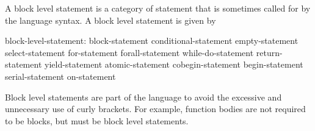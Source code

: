 A block level statement is a category of statement that is sometimes
called for by the language syntax. A block level statement is given by
\begin{syntax}
block-level-statement:
  block-statement
  conditional-statement
  empty-statement
  select-statement
  for-statement
  forall-statement
  while-do-statement
  return-statement
  yield-statement
  atomic-statement
  cobegin-statement
  begin-statement
  serial-statement
  on-statement
\end{syntax}

Block level statements are part of the language to avoid the excessive
and unnecessary use of curly brackets.  For example, function bodies
are not required to be blocks, but must be block level statements.
